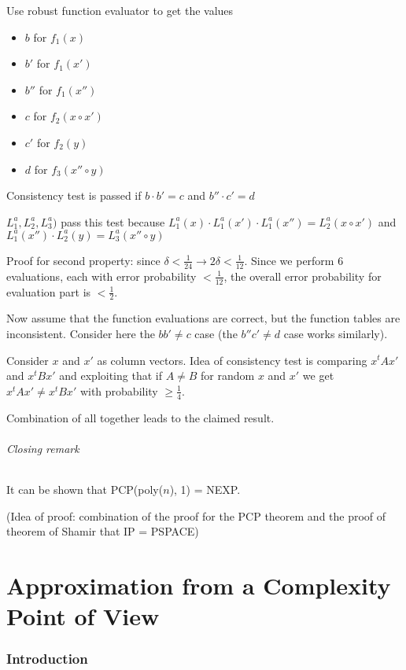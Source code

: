 \documentclass[11pt]{article}
\theoremstyle{definition}
\theoremstyle{definition}
\begin{document}
Use robust function evaluator to get the values
\begin{itemize}
\item $ b $ for $ f_1(x) $
\item $ b' $ for $ f_1(x') $
\item $ b'' $ for $ f_1(x'') $
\item $ c $ for $ f_2(x \circ x') $
\item $ c' $ for $ f_2(y) $
\item $ d $ for $ f_3(x'' \circ y) $
\end{itemize}

Consistency test is passed if $ b \cdot b' = c$ and $ b'' \cdot c' = d $

$ L_1^a, L_2^a, L_3^a )$ pass this test because $ L_1^a(x) \cdot L_1^a(x') \cdot L_1^a(x'') = L_2^a(x \circ x') $ and $ L_1^a(x'') \cdot L_2^a(y) = L_3^a(x'' \circ y) $

Proof for second property: since $ \delta < \frac{1}{24} \rightarrow 2\delta < \frac{1}{12} $. Since we perform 6 evaluations, each with error probability $ < \frac{1}{12} $, the overall error probability for evaluation part is $ < \frac{1}{2} $.

Now assume that the function evaluations are correct, but the function tables are inconsistent. Consider here the $ b b' \neq c $ case (the $ b'' c' \neq d $ case works similarly).

Consider $ x $ and $ x' $ as column vectors. Idea of consistency test is comparing $ x^t A x' $ and $ x^t B x' $ and exploiting that if $ A \neq B $ for random $ x $ and $ x' $ we get $ x^t A x' \neq x^t B x' $ with probability $ \geq \frac{1}{4} $. \bigskip

Combination of all together leads to the claimed result.

\paragraph{Closing remark}
It can be shown that PCP(poly($n$), 1) = NEXP.

(Idea of proof: combination of the proof for the PCP theorem and the proof of theorem of Shamir that IP = PSPACE)


\part{Approximation from a Complexity Point of View}

\section{Introduction}
\end{document}
